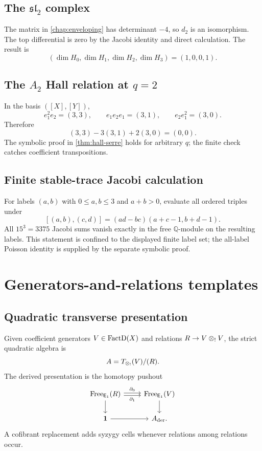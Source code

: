 \section{The \(\mathfrak{sl}_2\) complex}
The matrix in \cref{chap:enveloping} has determinant \(-4\), so \(d_2\) is an isomorphism.  The top differential is zero by the Jacobi identity and direct calculation.  The result is
\[
 (\dim H_0,\dim H_1,\dim H_2,\dim H_3)=(1,0,0,1).
\]

\section{The \(A_2\) Hall relation at \(q=2\)}
In the basis \(([X],[Y])\),
\[
 e_1^2e_2=(3,3),
 \qquad
 e_1e_2e_1=(3,1),
 \qquad
 e_2e_1^2=(3,0).
\]
Therefore
\[
 (3,3)-3(3,1)+2(3,0)=(0,0).
\]
The symbolic proof in \cref{thm:hall-serre} holds for arbitrary \(q\); the finite check catches coefficient transpositions.

\section{Finite stable-trace Jacobi calculation}
For labels \((a,b)\) with \(0\le a,b\le3\) and \(a+b>0\), evaluate all ordered triples under
\[
 [(a,b),(c,d)]=(ad-bc)(a+c-1,b+d-1).
\]
All \(15^3=3375\) Jacobi sums vanish exactly in the free
\(\mathbb Q\)-module on the resulting labels.  This statement is confined to
the displayed finite label set; the all-label Poisson identity is supplied by
the separate symbolic proof.

\chapter{Generators-and-relations templates}\label{app:templates}

\section{Quadratic transverse presentation}
Given coefficient generators \(V\in\operatorname{FactD}(X)\) and relations \(R\to V\mathbin{\otimes_{!}} V\), the strict quadratic algebra is
\[
 A=T_{\mathbin{\otimes_{!}}}(V)/(R).
\]
The derived presentation is the homotopy pushout
\[
\begin{tikzcd}
 \Free_{\Eone}(R)\arrow[r,shift left=0.4ex,"\partial_0"]
 \arrow[r,shift right=0.4ex,"\partial_1"']
 \arrow[d]
 &\Free_{\Eone}(V)\arrow[d]\\
 \one\arrow[r]&A_{\mathrm{der}}.
\end{tikzcd}
\]
A cofibrant replacement adds syzygy cells whenever relations among relations occur.


